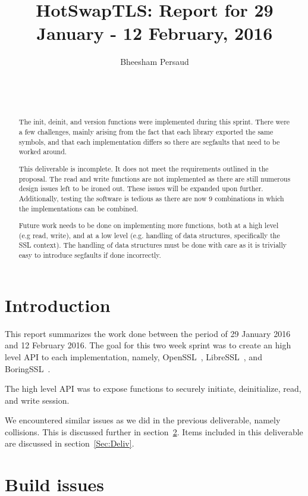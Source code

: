 \documentclass{acm_proc_article-sp}
\title{HotSwapTLS: Report for 29 January - 12 February, 2016}
\author{
    \alignauthor
    Bheesham Persaud\\
        \affaddr{Carleton University}\\
        \affaddr{1125 Colonel By Drive}\\
        \affaddr{Ottawa, Ontario}\\
        \email{bheeshampersaud@cmail.carleton.ca}
}
\begin{document}
\maketitle

\begin{abstract}\label{sec:abstract}
  The init, deinit, and version functions were implemented during this sprint.
  There were a few challenges, mainly arising from the fact that each library
  exported the same symbols, and that each implementation differs so there are
  segfaults that need to be worked around.

  This deliverable is incomplete. It does not meet the requirements outlined in
  the proposal. The read and write functions are not implemented as there are
  still numerous design issues left to be ironed out. These issues will be
  expanded upon further. Additionally, testing the software is tedious as there
  are now $9$ combinations in which the implementations can be combined.

  Future work needs to be done on implementing more functions, both at a high
  level (e.g read, write), and at a low level (e.g. handling of data structures,
  specifically the SSL context). The handling of data structures must be done
  with care as it is trivially easy to introduce segfaults if done incorrectly.
\end{abstract}

\section{Introduction}

This report summarizes the work done between the period of 29 January 2016 and
12 February 2016. The goal for this two week sprint was to create an high level
API to each implementation, namely, OpenSSL~\cite{openssl},
LibreSSL~\cite{libre}, and BoringSSL~\cite{boringssl}.

The high level API was to expose functions to securely initiate, deinitialize,
read, and write session.

We encountered similar issues as we did in the previous deliverable, namely
collisions. This is discussed further in section~\ref{Sec:Issues}. Items
included in this deliverable are discussed in section~\ref{Sec:Deliv}.

\pagebreak

\section{Build issues}\label{Sec:Issues}
\end{document}
